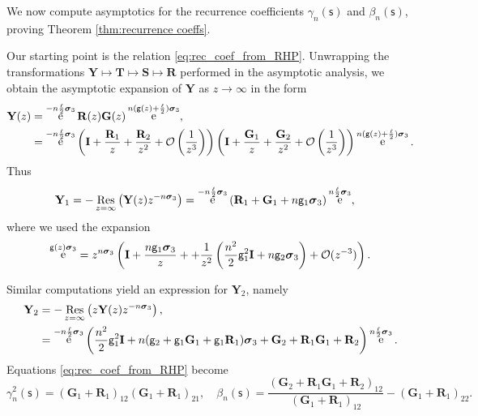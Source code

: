 \documentclass[reqno,a4paper,11pt]{amsart}
\DeclareMathOperator{\ee}{\rm e}
\newcommand{\res}{\mathop{\rm Res}}
\newcommand{\Boh}{\mathcal{O}}
\renewcommand{\bm}{\mathbf}
\newcommand{\msf}{\mathsf}
\renewcommand{\sp}{\boldsymbol \sigma}
\newcommand{\sad}{\msf s}
\theoremstyle{definition}
\theoremstyle{remark}
\numberwithin{equation}{section}
\begin{document}
We now compute asymptotics for the recurrence coefficients $\gamma_n(\sad)$ and $\beta_n(\sad)$, proving Theorem \ref{thm:recurrence coeffs}.

Our starting point is the relation \eqref{eq:rec_coef_from_RHP}. Unwrapping the transformations $\bm Y\mapsto \bm T\mapsto \bm S\mapsto \bm R$ performed in the asymptotic analysis, we obtain the asymptotic expansion of $\bm Y$ as $z\to \infty$ in the form
    \[
        \begin{split}
        \bm Y(z)
            &= \ee^{- n \frac{\ell}{2} \sp_3} \bm R(z) \bm G(z) \ee^{n (\msf g(z) + \frac{\ell}{2 })\sp_3}, \\
            &= \ee^{- n \frac{\ell}{2} \sp_3} \left( \bm I + \frac{\bm R_1}{z} + \frac{\bm R_2}{z^2} + \Boh \left( \frac{1}{z^3}\right)\right) \left( \bm I + \frac{\bm G_1}{z} + \frac{\bm G_2}{z^2} + \Boh\left( \frac{1}{z^3}\right) \right) \ee^{n (\msf g(z) + \frac{\ell}{2 })\sp_3}.
        \end{split} 
    \]
    Thus
    \[
    \begin{split}
         \bm Y_1 
         &= -\res_{z = \infty} \left( \bm Y(z) z^{-n \sp_3} \right)  
        =  \ee^{- n \frac{\ell}{2} \sp_3}
 \left( \bm R_1 + \bm G_1 + n \msf g_1 \sp_3\right) \ee^{n \frac{\ell}{2} \sp_3},
 \end{split}
    \]
where we used the expansion
%
$$
\ee^{\msf g(z)\sp_3}=
z^{n\sp_3}\left( \bm I + \frac{n \msf g_1\sp_3}{z} ++ \frac{1}{z^2}\left(\frac{n^2}{2} \msf g_1^2\bm I+n\msf g_2\sp_3\right)+\Boh(z^{-3})\right).
$$
%

    Similar computations yield an expression for $\bm Y_2$, namely
    \[
    \begin{split}
         \bm Y_2 
        &= -\res_{z = \infty} \left( z\bm Y(z) z^{-n \sp_3} \right), \\ 
        &=  \ee^{- n \frac{\ell}{2} \sp_3}
 \left(\frac{n^2}{2} \msf g_1^2\bm I+n(\msf g_2+\msf g_1\bm G_1+\msf g_1\bm R_1)\sp_3+ \bm G_2 + \bm R_1\bm G_1+\bm R_2 \right) \ee^{n \frac{\ell}{2} \sp_3}.
  \end{split}
 \]
    Equations \eqref{eq:rec_coef_from_RHP} become
%
\begin{equation}\label{eq:gammanbetanexpansion}
    \gamma_n^2(\sad)=\left(\bm G_1+\bm R_1\right)_{12}\left(\bm G_1+\bm R_1\right)_{21}, \quad
    \beta_n(\sad)=
\frac{(\bm G_2+\bm R_1\bm G_1+\bm R_2)_{12}}{(\bm G_1+\bm R_1)_{12}}-(\bm G_1+\bm R_1)_{22}.
\end{equation}
%
\end{document}
